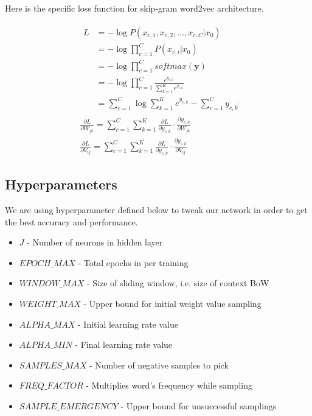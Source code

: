 \documentclass{article}
\begin{document}
Here is the specific loss function for skip-gram word2vec architecture.

\begin{align}
	&\begin{aligned}
		L &= -\log P(x_{c,1}, x_{c,2},\ldots,x_{c,C}|x_0) \\
		&= -\log \prod_{c=1}^C P(x_{c,i}|x_0) \\
		&= -\log \prod_{c=1}^C softmax(\boldsymbol{y}) \\
		&= -\log \prod_{c=1}^C \frac{e^{y_{c,k^\prime}}}{\sum_{k=1}^K e^{y_{c,k}}} \\
		&= \sum_{c=1}^C \log\sum_{k=1}^K e^{y_{c,k}} - \sum_{c=1}^C y_{c,k^\prime}
	\end{aligned} \\
	&\frac{\partial L}{\partial W_{jk}} = \sum_{c=1}^C \sum_{k=1}^K
	\frac{\partial L}{\partial y_{c,k}} \cdot \frac{\partial y_{c,k}}{\partial
	W_{jk}} \\
	&\frac{\partial L}{\partial V_{ij}} = \sum_{c=1}^C \sum_{k=1}^K
	\frac{\partial L}{\partial y_{c,k}} \cdot \frac{\partial y_{c,k}}{\partial
	V_{ij}}
\end{align}

\subsection{Hyperparameters}

We are using hyperparameter defined below to tweak our network in order to get the best accuracy and performance.

\begin{itemize}
	\item $J$ - Number of neurons in hidden layer
	\item $EPOCH\_MAX$ - Total epochs in per training
	\item $WINDOW\_MAX$ - Size of sliding window, i.e. size of context BoW
	\item $WEIGHT\_MAX$ - Upper bound for initial weight value sampling
	\item $ALPHA\_MAX$ - Initial learning rate value
	\item $ALPHA\_MIN$ - Final learning rate value
	\item $SAMPLES\_MAX$ - Number of negative samples to pick
	\item $FREQ\_FACTOR$ - Multiplies word's frequency while sampling
	\item $SAMPLE\_EMERGENCY$ - Upper bound for unsuccessful samplings
\end{itemize}
\end{document}
